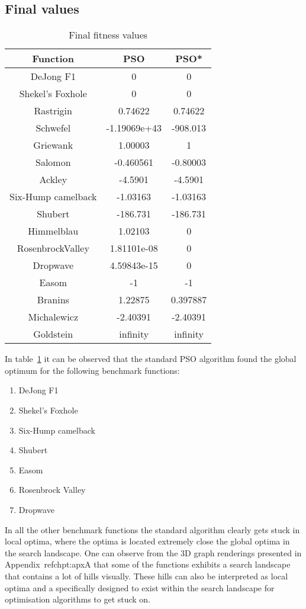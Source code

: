 \subsection{Final values}
\begin{table}[h]
\label{tbl:fitnessValues}
\begin{center}
	\begin{tabular}{| c | c | c |}
	\hline
	Function & PSO & PSO*\\  \hline
	DeJong F1 & 0 & 0 \\ \hline
	Shekel's Foxhole & 0 & 0 \\ \hline
	Rastrigin & 0.74622  & 0.74622\\ \hline
	Schwefel & -1.19069e+43  & -908.013\\ \hline
	Griewank & 1.00003 & 1 \\ \hline
	Salomon & -0.460561 & -0.80003 \\ \hline
	Ackley & -4.5901 & -4.5901 \\ \hline
	Six-Hump camelback & -1.03163 & -1.03163 \\ \hline
	Shubert & -186.731 & -186.731 \\ \hline
	Himmelblau & 1.02103 & 0 \\ \hline
	RosenbrockValley & 1.81101e-08 & 0 \\ \hline
	Dropwave & 4.59843e-15 & 0 \\ \hline
	Easom & -1 & -1 \\ \hline
	Branins & 1.22875 & 0.397887 \\ \hline
	Michalewicz & -2.40391 & -2.40391 \\ \hline
	Goldstein & infinity  & infinity\\ \hline
	\end{tabular}
\end{center}
\caption{Final fitness values}
\end{table}
In table~\ref{tbl:fitnessValues} it can be observed that the standard PSO algorithm found the global optimum for the following benchmark functions:
\begin{enumerate}
\item DeJong F1 
\item Shekel's Foxhole
\item Six-Hump camelback
\item Shubert
\item Easom
\item Rosenbrock Valley
\item Dropwave
\end{enumerate}
In all the other benchmark functions the standard algorithm clearly gets stuck in local optima, where the optima is located extremely close the global optima in the search landscape. One can observe from the 3D graph renderings presented in Appendix~ref{chpt:apxA} that some of the functions exhibits a search landscape that contains a lot of hills visually. These hills can also be interpreted as local optima and a specifically designed to exist within the search landscape for optimisation algorithms to get stuck on.

